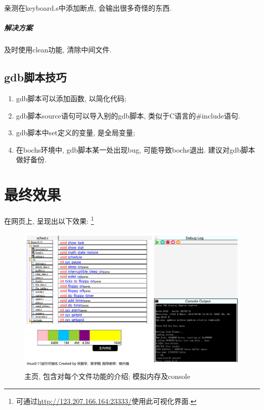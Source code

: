 \documentclass[]{report}
\begin{document}
亲测在keyboard.s中添加断点, 会输出很多奇怪的东西.
\subparagraph{解决方案}
及时使用clean功能, 清除中间文件. 

\subsection{gdb脚本技巧}
\begin{enumerate}
    \item gdb脚本可以添加函数, 以简化代码;
    \item gdb脚本source语句可以导入别的gdb脚本, 类似于C语言的\#include语句.
    \item gdb脚本中set定义的变量, 是全局变量;
    \item 在bochs环境中, gdb脚本某一处出现bug, 可能导致bochs退出. 建议对gdb脚本做好备份.
\end{enumerate}

\section{最终效果}

在网页上, 呈现出以下效果: \footnote{可通过\url{http://123.207.166.164:23333/}使用此可视化界面.}
\begin{figure}[htbp]
    \centering
    \includegraphics[width=\textwidth,natwidth=773 ,natheight=487]{img/index.html.pdf}
    \caption[]{主页, 包含对每个文件功能的介绍; 模拟内存及console}
    \label{fig:indexgraph}
\end{figure}
\end{document}

